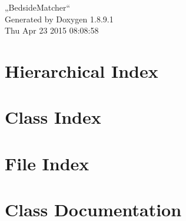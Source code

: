\documentclass[twoside]{book}
\newcommand{\+}{\discretionary{\mbox{\scriptsize$\hookleftarrow$}}{}{}}
\newcommand{\clearemptydoublepage}{%
  \newpage{\pagestyle{empty}\cleardoublepage}%
}
\begin{document}
\hypersetup{pageanchor=false,
             bookmarks=true,
             bookmarksnumbered=true,
             pdfencoding=unicode
            }
\begin{titlepage}
\vspace*{7cm}
\begin{center}%
{\Large „\+Bedside\+Matcher“ }\\
\vspace*{1cm}
{\large Generated by Doxygen 1.8.9.1}\\
\vspace*{0.5cm}
{\small Thu Apr 23 2015 08:08:58}\\
\end{center}
\end{titlepage}
\clearemptydoublepage
\tableofcontents
\clearemptydoublepage
{}
\hypersetup{pageanchor=true}

\chapter{Hierarchical Index}

\chapter{Class Index}

\chapter{File Index}

\chapter{Class Documentation}














\end{document}
